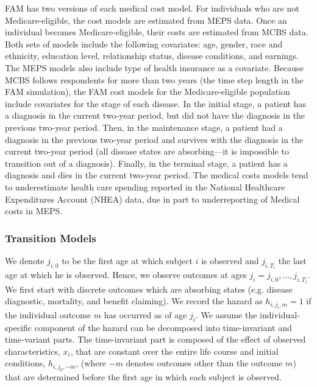 \noindent FAM has two versions of each medical cost model. For individuals who are not Medicare-eligible, the cost models are estimated from MEPS data.
Once an individual becomes Medicare-eligible, their costs are estimated from MCBS data. Both sets of models include the following covariates:
age, gender, race and ethnicity, education level, relationship status, disease conditions, and earnings.
The MEPS models also include type of health insurance as a covariate.
Because MCBS follows respondents for more than two years (the time step length in the FAM simulation), the FAM cost models for the Medicare-eligible population include covariates for the stage of each disease.
In the initial stage, a patient has a diagnosis in the current two-year period, but did not have the diagnosis in the previous two-year period.
Then, in the maintenance stage, a patient had a diagnosis in the previous two-year period and survives with the diagnosis in the current two-year period (all disease states are absorbing---it is impossible to transition out of a diagnosis).
Finally, in the terminal stage, a patient has a diagnosis and dies in the current two-year period.
The medical costs models tend to underestimate health care spending reported in the National Healthcare Expenditures Account (NHEA) data, due in part to underreporting of Medical costs in MEPS. \\

\subsubsection{Transition Models}
\label{section:transition_models}

\noindent We denote
$j_{i,0}$ to be the first age at which subject $i$ is observed and $j_{i,T_i}$ the
last age at which he is observed. Hence, we observe outcomes at ages
$j_i = j_{i,0},\ldots,j_{i,T_i}$.
We first start with discrete outcomes which are absorbing states (e.g. disease
diagnostic, mortality, and benefit claiming). We record the hazard as $h_{i,j_i,m}=1$ if the
individual outcome $m$ has occurred as of age $j_i$. We assume the
individual-specific component of the hazard can be decomposed into time-invariant and time-variant parts. The time-invariant part is composed of the effect of
observed characteristics, $x_i$, that are constant over the entire life course and
initial conditions, $h_{i,j_0,-m}$, (where $-m$ denotes outcomes other than the outcome
$m$) that are determined before the first age in which each subject is observed. \\

